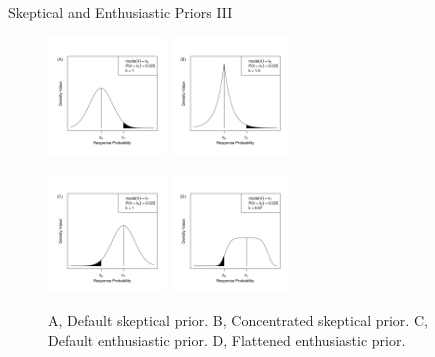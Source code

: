 \documentclass{beamer}
\begin{document}
\begin{frame}{Skeptical and Enthusiastic Priors III}
\begin{figure}[htbp]
\begin{center}
\vspace{-0.3cm}

\includegraphics[width=0.28\textwidth]{./figures/figure1a.png}
\includegraphics[width=0.28\textwidth]{./figures/figure1b.png}

\includegraphics[width=0.28\textwidth]{./figures/figure1c.png}
\includegraphics[width=0.28\textwidth]{./figures/figure1d.png}
\caption{A, Default skeptical prior.    B, Concentrated skeptical prior.
         C, Default enthusiastic prior. D, Flattened enthusiastic prior.}

\label{fig:figure1}
\end{center}
\end{figure}
	
\end{frame}
\end{document}
